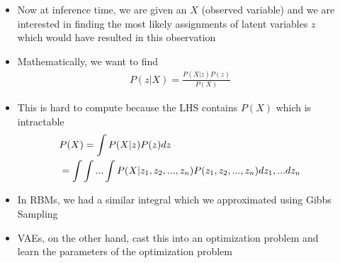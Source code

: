 \begin{frame}
	\begin{columns}
		\begin{overlayarea}{\textwidth}{\textheight}
			\vspace{3pt}
			
			\vspace{-20pt}

		\end{overlayarea}
		\begin{overlayarea}{\textwidth}{\textheight}
			\footnotesize{\begin{itemize}\justifying
				\item<1->Now at inference time, we are given an $X$ (observed variable) and we are interested in finding the most likely assignments of latent variables $z$ which would have resulted in this observation
				\item<2-> Mathematically, we want to find
				\begin{align*}
				P(z|X) = \frac{P(X|z)P(z)}{ P(X)}
				\end{align*}
				\item<3-> This is hard to compute because the LHS contains $P(X)$ which is intractable
				\vspace{-0.1in}
				\begin{align*}
				\hspace{-17em}
					&P(X) = \int P(X|z)P(z) dz\\
					&= \int \int...\int P(X|z_1,z_2, ...,z_n)P(z_1,z_2, ...,z_n) dz_1, ...dz_n
				\end{align*}
				\item<4->  In RBMs, we had a similar integral which we approximated using Gibbs Sampling
				\item<5-> VAEs, on the other hand, cast this into an optimization problem and learn the parameters of the optimization problem
			\end{itemize}}
		\end{overlayarea}
	\end{columns}
\end{frame}


